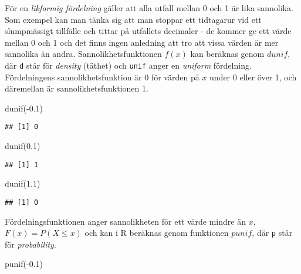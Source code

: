 \documentclass[
]{book}
\newenvironment{Shaded}{\begin{snugshade}}{\end{snugshade}}
\newcommand{\FloatTok}[1]{\textcolor[rgb]{0.00,0.00,0.81}{#1}}
\newcommand{\FunctionTok}[1]{\textcolor[rgb]{0.00,0.00,0.00}{#1}}
\newcommand{\NormalTok}[1]{#1}
\newcommand{\SpecialCharTok}[1]{\textcolor[rgb]{0.00,0.00,0.00}{#1}}
\theoremstyle{definition}
\theoremstyle{definition}
\theoremstyle{definition}
\theoremstyle{definition}
\theoremstyle{remark}
\begin{document}
För en \emph{likformig fördelning} gäller att alla utfall mellan 0 och 1 är lika sannolika. Som exempel kan man tänka sig att man stoppar ett tidtagarur vid ett slumpmässigt tillfälle och tittar på utfallets decimaler - de kommer ge ett värde mellan 0 och 1 och det finns ingen anledning att tro att vissa värden är mer sannolika än andra. Sannolikhetsfunktionen \(f(x)\) kan beräknas genom \(dunif\), där \texttt{d} står för \emph{density} (täthet) och \texttt{unif} anger en \emph{uniform} fördelning. Fördelningens sannolikhetsfunktion är 0 för värden på \(x\) under 0 eller över 1, och däremellan är sannolikhetsfunktionen 1.

\begin{Shaded}
\begin{Highlighting}[]
\FunctionTok{dunif}\NormalTok{(}\SpecialCharTok{{-}}\FloatTok{0.1}\NormalTok{)}
\end{Highlighting}
\end{Shaded}

\begin{verbatim}
## [1] 0
\end{verbatim}

\begin{Shaded}
\begin{Highlighting}[]
\FunctionTok{dunif}\NormalTok{(}\FloatTok{0.1}\NormalTok{)}
\end{Highlighting}
\end{Shaded}

\begin{verbatim}
## [1] 1
\end{verbatim}

\begin{Shaded}
\begin{Highlighting}[]
\FunctionTok{dunif}\NormalTok{(}\FloatTok{1.1}\NormalTok{)}
\end{Highlighting}
\end{Shaded}

\begin{verbatim}
## [1] 0
\end{verbatim}

Fördelningsfunktionen anger sannolikheten för ett värde mindre än \(x\), \(F(x) = P(X \leq x)\) och kan i R beräknas genom funktionen \(punif\), där \texttt{p} står för \emph{probability}.

\begin{Shaded}
\begin{Highlighting}[]
\FunctionTok{punif}\NormalTok{(}\SpecialCharTok{{-}}\FloatTok{0.1}\NormalTok{)}
\end{Highlighting}
\end{Shaded}
\end{document}
